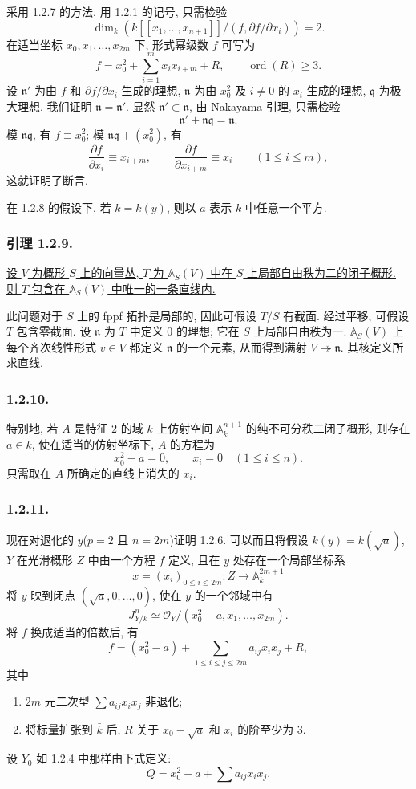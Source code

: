 采用 1.2.7 的方法. 用 1.2.1 的记号, 只需检验
\[
\dim_k\left(
k[[x_1,\ldots,x_{n+1}]]\big/
  (f,\partial f/\partial x_i)
\right)=2.
\]
在适当坐标 $x_0,x_1,\ldots,x_{2m}$ 下, 形式幂级数 $f$ 可写为
\[
f=x_0^2+\sum_{i=1}^m x_ix_{i+m}+R,
\qquad\operatorname{ord}(R)\geq3.
\]
设 $\mathfrak n'$ 为由 $f$ 和 $\partial f/\partial x_i$ 生成的理想, $\mathfrak n$ 为由 $x_0^2$ 及 $i\ne0$ 的 $x_i$ 生成的理想, $\mathfrak q$ 为极大理想. 我们证明 $\mathfrak n=\mathfrak n'$. 显然 $\mathfrak n'\subset\mathfrak n$, 由 Nakayama 引理, 只需检验
\[
\mathfrak n'+\mathfrak n\mathfrak q=\mathfrak n.
\]
模 $\mathfrak n\mathfrak q$, 有 $f\equiv x_0^2$; 模 $\mathfrak n\mathfrak q+(x_0^2)$, 有
\[
\frac{\partial f}{\partial x_i}\equiv x_{i+m},
\qquad
\frac{\partial f}{\partial x_{i+m}}\equiv x_i
\qquad(1\leq i\leq m),
\]
这就证明了断言.

在 1.2.8 的假设下, 若 $k=k(y)$, 则以 $a$ 表示 $k$ 中任意一个平方.

\subsubsection*{引理 1.2.9.}
\underline{设 $V$ 为概形 $S$ 上的向量丛, $T$ 为 $\mathbb A_S(V)$ 中在 $S$ 上局部自由秩为二的闭子概形. 则 $T$ 包含在 $\mathbb A_S(V)$ 中唯一的一条直线内.}

此问题对于 $S$ 上的 fppf 拓扑是局部的, 因此可假设 $T/S$ 有截面. 经过平移, 可假设 $T$ 包含零截面. 设 $\mathfrak n$ 为 $T$ 中定义 $0$ 的理想; 它在 $S$ 上局部自由秩为一. $\mathbb A_S(V)$ 上每个齐次线性形式 $v\in V$ 都定义 $\mathfrak n$ 的一个元素, 从而得到满射 $V\twoheadrightarrow\mathfrak n$. 其核定义所求直线.

\subsubsection*{1.2.10.}
特别地, 若 $A$ 是特征 $2$ 的域 $k$ 上仿射空间 $\mathbb A_k^{n+1}$ 的纯不可分秩二闭子概形, 则存在 $a\in k$, 使在适当的仿射坐标下, $A$ 的方程为
\[
x_0^2-a=0,
\qquad x_i=0\quad(1\leq i\leq n).
\]
只需取在 $A$ 所确定的直线上消失的 $x_i$.

\subsubsection*{1.2.11.}
现在对退化的 $y$($p=2$ 且 $n=2m$)证明 1.2.6. 可以而且将假设 $k(y)=k(\sqrt a)$, $Y$ 在光滑概形 $Z$ 中由一个方程 $f$ 定义, 且在 $y$ 处存在一个局部坐标系
\[
x=(x_i)_{0\leq i\leq2m}:
Z\longrightarrow\mathbb A_k^{2m+1}
\]
将 $y$ 映到闭点 $(\sqrt a,0,\ldots,0)$, 使在 $y$ 的一个邻域中有
\[
J^n_{Y/k}\simeq
\mathcal O_Y/(x_0^2-a,x_1,\ldots,x_{2m}).
\]
将 $f$ 换成适当的倍数后, 有
\[
f=(x_0^2-a)+
 \sum_{1\leq i\leq j\leq2m}a_{ij}x_ix_j+R,
\]
其中
\begin{enumerate}[label=(\alph*),leftmargin=2.6em]
\item $2m$ 元二次型 $\sum a_{ij}x_ix_j$ 非退化;
\item 将标量扩张到 $\bar k$ 后, $R$ 关于 $x_0-\sqrt a$ 和 $x_i$ 的阶至少为 $3$.
\end{enumerate}
设 $Y_0$ 如 1.2.4 中那样由下式定义:
\[
Q=x_0^2-a+\sum a_{ij}x_ix_j.
\]

